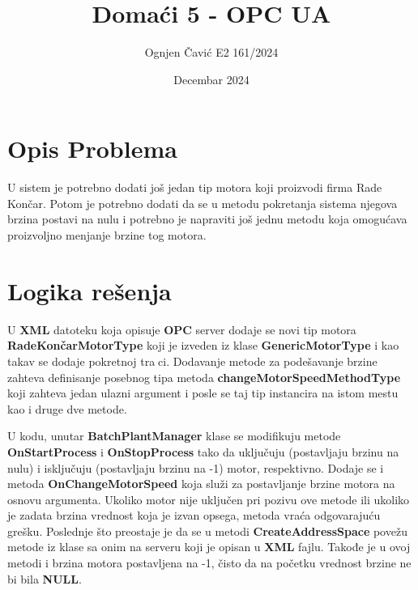 \documentclass[12pt]{article}
\title{Domaći 5 - OPC UA}
\author{Ognjen Čavić E2 161/2024}
\date{Decembar 2024}
\begin{document}
\maketitle
\section{Opis Problema}
\par U sistem je potrebno dodati još jedan tip motora koji proizvodi firma Rade
Končar.
Potom je potrebno dodati da se u metodu pokretanja sistema njegova brzina
postavi na nulu i potrebno je napraviti još jednu metodu koja omogućava proizvoljno
menjanje brzine tog motora.
\section{Logika rešenja}
\par U \textbf{XML} datoteku koja opisuje \textbf{OPC} server dodaje se novi tip
motora \textbf{RadeKončarMotorType} koji je izveden iz klase
\textbf{GenericMotorType} i kao takav se dodaje pokretnoj traci.
Dodavanje metode za podešavanje brzine zahteva definisanje posebnog tipa metoda
\textbf{changeMotorSpeedMethodType} koji zahteva jedan ulazni argument i posle
se taj tip instancira na istom mestu kao i druge dve metode.
\par U kodu, unutar \textbf{BatchPlantManager} klase se modifikuju metode
\textbf{OnStartProcess} i \textbf{OnStopProcess} tako da uključuju (postavljaju
brzinu na nulu) i isključuju (postavljaju brzinu na -1) motor, respektivno.
Dodaje se i metoda \textbf{OnChangeMotorSpeed} koja služi za postavljanje
brzine motora na osnovu argumenta.
Ukoliko motor nije uključen pri pozivu ove metode ili ukoliko je zadata brzina
vrednost koja je izvan opsega, metoda vraća odgovarajuću grešku.
Poslednje što preostaje je da se u metodi \textbf{CreateAddressSpace} povežu
metode iz klase sa onim na serveru koji je opisan u \textbf{XML} fajlu.
Takođe je u ovoj metodi i brzina motora postavljena na -1, čisto da na početku
vrednost brzine ne bi bila \textbf{NULL}.
\end{document}
